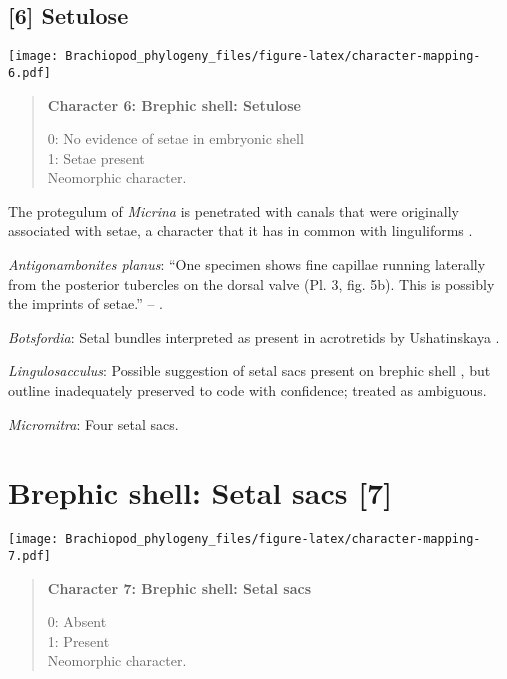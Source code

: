 \documentclass[openany]{book}
\theoremstyle{definition}
\theoremstyle{definition}
\theoremstyle{definition}
\theoremstyle{remark}
\begin{document}
\subsection*{{[}6{]} Setulose}\label{setulose}

\texttt{[image: Brachiopod\_phylogeny\_files/figure-latex/character-mapping-6.pdf]}

\begin{quote}
\textbf{Character 6: Brephic shell: Setulose}

0: No evidence of setae in embryonic shell\\
1: Setae present\\
Neomorphic character.
\end{quote}

The protegulum of \emph{Micrina} is penetrated with canals that were
originally associated with setae, a character that it has in common with
linguliforms \citep{Holmer2011Firstrecord}.

\hypertarget{Antigonambonites_planus-coding-6}{}
\emph{Antigonambonites planus}: ``One specimen shows fine capillae
running laterally from the posterior tubercles on the dorsal valve (Pl.
3, fig. 5b). This is possibly the imprints of setae.'' --
\citet{Ushatinskaya2016Revisionof}.

\hypertarget{Botsfordia-coding-6}{}
\emph{Botsfordia}: Setal bundles interpreted as present in acrotretids
by Ushatinskaya \citeyearpar{Ushatinskaya2016Protegulumand}.

\hypertarget{Lingulosacculus-coding-6}{}
\emph{Lingulosacculus}: Possible suggestion of setal sacs present on
brephic shell \citep{Holmer1997EarlyCambrian, Li2004}, but outline
inadequately preserved to code with confidence; treated as ambiguous.

\hypertarget{Micromitra-coding-6}{}
\emph{Micromitra}: Four setal sacs.

\section{Brephic shell: Setal sacs
{[}7{]}}\label{brephic-shell-setal-sacs-7}

\texttt{[image: Brachiopod\_phylogeny\_files/figure-latex/character-mapping-7.pdf]}

\begin{quote}
\textbf{Character 7: Brephic shell: Setal sacs}

0: Absent\\
1: Present\\
Neomorphic character.
\end{quote}
\end{document}
